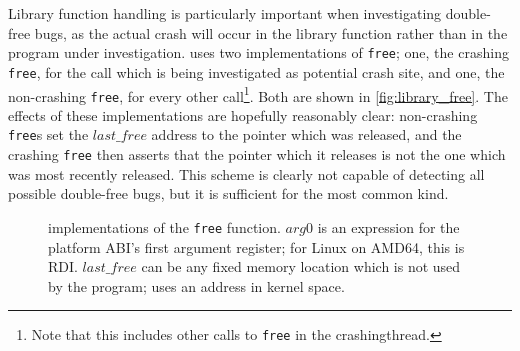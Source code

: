 Library function handling is particularly important when investigating
double-free bugs, as the actual crash will occur in the library
function rather than in the program under investigation.  {\Technique}
uses two implementations of \texttt{free}; one, the crashing
\texttt{free}, for the call which is being investigated as potential
crash site, and one, the non-crashing \texttt{free}, for every other
call\footnote{Note that this includes other calls to \texttt{free} in
  the \gls{crashingthread}.}.  Both are shown in
\autoref{fig:library_free}.  The effects of these implementations are
hopefully reasonably clear: non-crashing \texttt{free}s set the
$\mathit{last\_free}$ address to the pointer which was released, and
the crashing \texttt{free} then asserts that the pointer which it
releases is not the one which was most recently released.  This scheme
is clearly not capable of detecting all possible double-free bugs, but
it is sufficient for the most common kind.

\begin{figure}
  \vspace{-12pt}
  \caption{{\StateMachine} implementations of the \texttt{free}
    function. $arg0$ is an expression for the platform ABI's first
    argument register; for Linux on AMD64, this is RDI.
    $\mathit{last\_free}$ can be any fixed memory location which is
    not used by the program; {\implementation} uses an address in
    kernel space.}
  \label{fig:library_free}
\end{figure}

